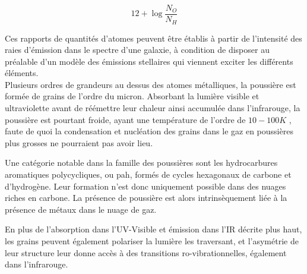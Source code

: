 \documentclass[12pt, a4paper]{article}
\begin{document}
\begin{equation}
  \label{eq:abundance}
  12 + \log{\frac{N_O}{N_H}}
\end{equation}

Ces rapports de quantités d'atomes peuvent être établis à partir de l'intensité des raies d'émission dans le spectre d'une galaxie, à condition de disposer au préalable d'un modèle des émissions stellaires qui viennent exciter les différents éléments.\\

Plusieurs ordres de grandeurs au dessus des atomes métalliques, la poussière est formée de grains de l'ordre du micron. Absorbant la lumière visible et ultraviolette avant de réémettre leur chaleur ainsi accumulée dans l'infrarouge, la poussière est pourtant froide, ayant une température de l'ordre de $10 - 100K$ \parencite{Astrophysics-of-the-Diffuse-Universe}, faute de quoi la condensation et nucléation des grains dans le gaz en poussières plus grosses ne pourraient pas avoir lieu.

Une catégorie notable dans la famille des poussières sont les hydrocarbures aromatiques polycycliques, ou \gls{pah}, formés de cycles hexagonaux de carbone et d'hydrogène. Leur formation n'est donc uniquement possible dans des nuages riches en carbone. La présence de poussière est alors intrinsèquement liée à la présence de métaux dans le nuage de gaz.

En plus de l'absorption dans l'UV-Visible et émission dans l'IR décrite plus haut, les grains peuvent également polariser la lumière les traversant, et l'asymétrie de leur structure leur donne accès à des transitions ro-vibrationnelles, également dans l'infrarouge.\\
\end{document}
